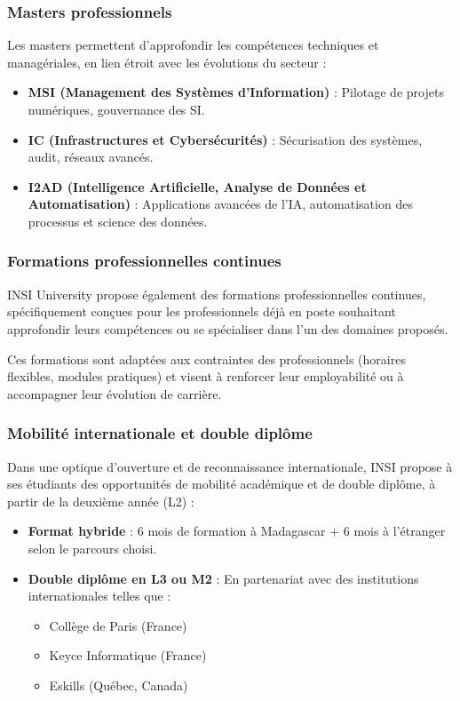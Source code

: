 \documentclass[a4paper,12pt, oneside]{article}
\begin{document}
\subsubsection{Masters professionnels}

Les masters permettent d’approfondir les compétences techniques et managériales, en lien étroit avec les évolutions du secteur :

\begin{itemize}
    \item \textbf{MSI (Management des Systèmes d’Information)} : Pilotage de projets numériques, gouvernance des SI.
    \item \textbf{IC (Infrastructures et Cybersécurités)} : Sécurisation des systèmes, audit, réseaux avancés.
    \item \textbf{I2AD (Intelligence Artificielle, Analyse de Données et Automatisation)} : Applications avancées de l’IA, automatisation des processus et science des données.
\end{itemize}

\subsubsection{Formations professionnelles continues}

INSI University propose également des formations professionnelles continues, spécifiquement conçues pour les professionnels déjà en poste souhaitant approfondir leurs compétences ou se spécialiser dans l’un des domaines proposés.

Ces formations sont adaptées aux contraintes des professionnels (horaires flexibles, modules pratiques) et visent à renforcer leur employabilité ou à accompagner leur évolution de carrière.

\subsubsection{Mobilité internationale et double diplôme}

Dans une optique d’ouverture et de reconnaissance internationale, INSI propose à ses étudiants des opportunités de mobilité académique et de double diplôme, à partir de la deuxième année (L2) :

\begin{itemize}
    \item \textbf{Format hybride} : 6 mois de formation à Madagascar + 6 mois à l’étranger selon le parcours choisi.
    \item \textbf{Double diplôme en L3 ou M2} : En partenariat avec des institutions internationales telles que :
    \begin{itemize}
        \item Collège de Paris (France)
        \item Keyce Informatique (France)
        \item Eskills (Québec, Canada)
    \end{itemize}
\end{itemize}
\end{document}
